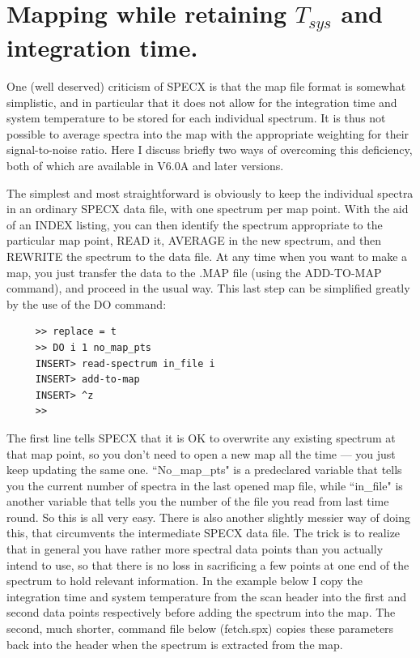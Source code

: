 \documentclass[11pt,twoside]{report}
\begin{document}
\newpage
\section{Mapping while retaining $T_{sys}$ and integration time.}

   One (well deserved) criticism of SPECX is that the map file format
is somewhat simplistic, and in particular that it does not allow for the
integration time and system temperature to be stored for each individual
spectrum. It is thus not possible to average spectra into the map with
the appropriate weighting for their signal-to-noise ratio.
Here I discuss briefly two ways of overcoming this deficiency, both
of which are available in V6.0A and later versions.

The simplest and most straightforward is obviously to keep the individual
spectra in an ordinary SPECX data file, with one spectrum per map point.
With the aid of an INDEX listing, you can then identify the spectrum
appropriate to the particular map point, READ it, AVERAGE in the new
spectrum, and then REWRITE the spectrum to the data file. At any time when
you want to make a map, you just transfer the data to the .MAP file
(using the ADD-TO-MAP command), and proceed in the usual way. This last
step can be simplified greatly by the use of the DO command:

\begin{verbatim}
     >> replace = t
     >> DO i 1 no_map_pts
     INSERT> read-spectrum in_file i
     INSERT> add-to-map
     INSERT> ^z
     >>
\end{verbatim}

The first line tells SPECX that it is OK to overwrite any existing spectrum at
that map point, so you don't need to open a new map all the time --- you just
keep updating the same one. ``No\_map\_pts" is a predeclared variable that tells you
the current number of spectra in the last opened map file, while ``in\_file" is
another variable that tells you the number of the file you read from last time
round. So this is all very easy. There is also another slightly messier way of
doing this, that circumvents the intermediate SPECX data file. The trick is to
realize that in general you have rather more spectral data points than you
actually intend to use, so that there is no loss in sacrificing a few points
at one end of the spectrum to hold relevant information. In the example below
I copy the integration time and system temperature from the scan header into
the first and second data points respectively before adding the spectrum into
the map. The second, much shorter, command file below (fetch.spx) copies these
parameters back into the header when the spectrum is extracted from the map.
\end{document}

